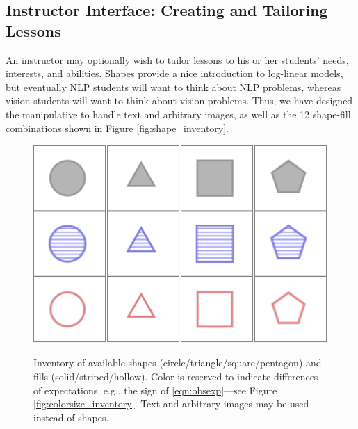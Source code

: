 \documentclass[11pt,letterpaper]{article}
\begin{document}
\subsection{Instructor Interface: Creating and Tailoring Lessons}\label{sec:tailoring}

An instructor may optionally wish to tailor lessons to his or her
students' needs, interests, and abilities.  Shapes provide a nice
introduction to log-linear models, but eventually NLP students will
want to think about NLP problems, whereas vision students will want to
think about vision problems.  Thus, we have designed the manipulative
to handle text and arbitrary images, as well as the 12 shape-fill
combinations shown in Figure \ref{fig:shape_inventory}.

\begin{figure}[t]
\begin{center}
\centering
\includegraphics[scale=.5]{images/different_shapes_fills3x4.PNG}
\caption{Inventory of available shapes
  (circle/triangle/square/pentagon) and fills (solid/striped/hollow).
 Color is reserved to indicate differences of expectations, e.g., 
 the sign of \eqref{eqn:obsexp}---see Figure \ref{fig:colorsize_inventory}.
  Text  and arbitrary images may be used instead of shapes.}
\label{fig:shape_inventory}
\label{fig:inventory}
\end{center}
\end{figure}
\end{document}
